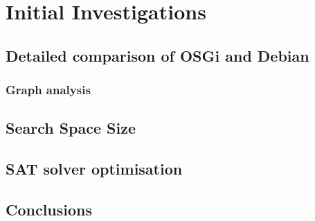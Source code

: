 \chapter{Initial Investigations}

\section{Detailed comparison of OSGi and Debian}

\subsection{Graph analysis}

\section{Search Space Size}

\section{SAT solver optimisation}

\section{Conclusions}
